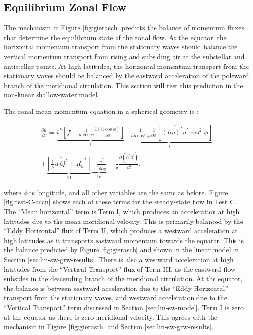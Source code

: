 \subsection{Equilibrium Zonal Flow}

The mechanism in Figure \ref{fig:gierasch} predicts the balance of momentum fluxes that determine the equilibrium state of the zonal flow. At the equator, the horizontal momentum transport from the stationary waves should balance the vertical momentum transport from rising and subsiding air at the substellar and antistellar points. At high latitudes, the horizontal momentum transport from the stationary waves should be balanced by the eastward acceleration of the poleward branch of the meridional circulation. This section will test this prediction in the non-linear shallow-water model.

The zonal-mean momentum equation in a spherical geometry is \citep{showman2011superrotation}:

\begin{equation}\label{eqn:zonal-mean-mom-sphere}
  \begin{split}
    \frac{\partial \overline{u}}{\partial t}=\underbrace{\overline{v}^{*}\left[f-\frac{1}{a \cos \phi} \frac{\partial(\overline{u} \cos \phi)}{\partial \phi}\right]}_{\mathrm{I}}
    \underbrace{-\frac{1}{\overline{h} a \cos ^{2} \phi} \frac{\partial}{\partial \phi}\left[\overline{(h v)^{\prime} u^{\prime}} \cos ^{2} \phi\right]}_{\mathrm{II}} \\
    +\underbrace{\left[\frac{1}{\overline{h}} \overline{u^{\prime} Q^{\prime}}+\overline{R_{u}}^{*}\right]}_{\text { III }} \underbrace{-\frac{\overline{u}^{*}}{\tau_{\mathrm{drag}}}}_{\mathrm{IV}}-\frac{1}{\overline{h}} \frac{\partial\left(\overline{h^{\prime} u^{\prime}}\right)}{\partial t},
  \end{split}
\end{equation}


where $\phi$ is longitude, and all other variables are the same as before. Figure \ref{fig:test-C-accn} shows each of these terms for the steady-state flow in Test C. The ``Mean horizontal'' term is Term I, which produces an acceleration at high latitudes due to the mean meridional velocity. This is primarily balanced by the ``Eddy Horizontal'' flux of Term II, which produces a westward acceleration at high latitudes as it transports eastward momentum towards the equator. This is the balance predicted by Figure \ref{fig:gierasch} and shown in the linear model in Section \ref{sec:lin-sw-grw-results}. There is also a westward acceleration at high latitudes from the ``Vertical Transport'' flux of Term III, as the eastward flow subsides in the descending branch of the meridional circulation. At the equator, the balance is between eastward acceleration due to the ``Eddy Horizontal'' transport from the stationary waves, and westward acceleration due to the ``Vertical Transport'' term discussed in Section \ref{sec:lin-sw-model}. Term I is zero at the equator as there is zero meridional velocity. This agrees with the mechanism in Figure \ref{fig:gierasch} and Section \ref{sec:lin-sw-grw-results}.

